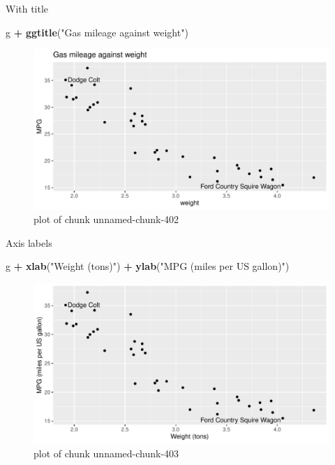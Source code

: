 \documentclass[ignorenonframetext,]{beamer}
\newenvironment{Shaded}{\begin{snugshade}}{\end{snugshade}}
\newcommand{\KeywordTok}[1]{\textcolor[rgb]{0.13,0.29,0.53}{\textbf{#1}}}
\newcommand{\NormalTok}[1]{#1}
\newcommand{\OperatorTok}[1]{\textcolor[rgb]{0.81,0.36,0.00}{\textbf{#1}}}
\newcommand{\StringTok}[1]{\textcolor[rgb]{0.31,0.60,0.02}{#1}}
\begin{document}
\begin{frame}[fragile]{With title}
\protect\hypertarget{with-title}{}

\begin{Shaded}
\begin{Highlighting}[]
\NormalTok{g }\OperatorTok{+}\StringTok{ }\KeywordTok{ggtitle}\NormalTok{(}\StringTok{"Gas mileage against weight"}\NormalTok{)}
\end{Highlighting}
\end{Shaded}

\begin{figure}
\centering
\includegraphics{figure/unnamed-chunk-402-1.pdf}
\caption{plot of chunk unnamed-chunk-402}
\end{figure}

\end{frame}

\begin{frame}[fragile]{Axis labels}
\protect\hypertarget{axis-labels}{}

\begin{Shaded}
\begin{Highlighting}[]
\NormalTok{g }\OperatorTok{+}\StringTok{ }\KeywordTok{xlab}\NormalTok{(}\StringTok{"Weight (tons)"}\NormalTok{) }\OperatorTok{+}\StringTok{ }\KeywordTok{ylab}\NormalTok{(}\StringTok{"MPG (miles per US gallon)"}\NormalTok{)}
\end{Highlighting}
\end{Shaded}

\begin{figure}
\centering
\includegraphics{figure/unnamed-chunk-403-1.pdf}
\caption{plot of chunk unnamed-chunk-403}
\end{figure}

\end{frame}
\end{document}
